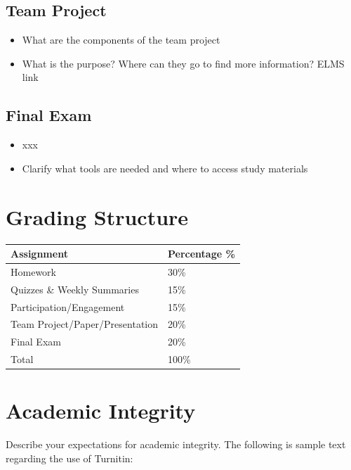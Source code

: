 \documentclass[11pt]{article}
\def\tightlist{}
\begin{document}
\hypertarget{team-project}{%
\subsection{Team Project}\label{team-project}}

\begin{itemize}
\tightlist
\item
  What are the components of the team project
\item
  What is the purpose? Where can they go to find more information? ELMS
  link
\end{itemize}

\hypertarget{final-exam}{%
\subsection{Final Exam}\label{final-exam}}

\begin{itemize}
\tightlist
\item
  xxx
\item
  Clarify what tools are needed and where to access study materials
\end{itemize}

\hypertarget{grading-structure}{%
\section{Grading Structure}\label{grading-structure}}

\begin{longtable}[]{@{}ll@{}}
\toprule()
Assignment & Percentage \% \\
\midrule()
\endhead
Homework & 30\% \\
Quizzes \& Weekly Summaries & 15\% \\
Participation/Engagement & 15\% \\
Team Project/Paper/Presentation & 20\% \\
Final Exam & 20\% \\
Total & 100\% \\
\bottomrule()
\end{longtable}

\hypertarget{academic-integrity}{%
\section{Academic Integrity}\label{academic-integrity}}

Describe your expectations for academic integrity. The following is
sample text regarding the use of Turnitin:
\end{document}
